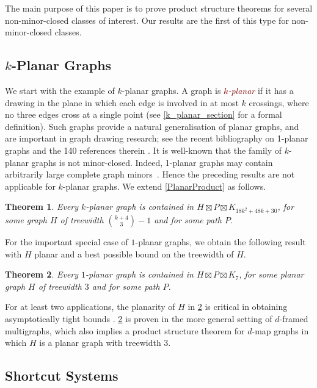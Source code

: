 \documentclass{patmorin}
\theoremstyle{plain}
\newtheorem{thm}{Theorem}
\theoremstyle{definition}
\newcommand{\defin}[1]{\textcolor{Maroon}{\emph{#1}}}
\begin{document}
The main purpose of this paper is to prove product structure theorems for several non-minor-closed classes of interest. Our results are the first of this type for non-minor-closed classes.

\subsection{$k$-Planar Graphs}

We start with the example of $k$-planar graphs. A graph is \defin{$k$-planar} if it has a drawing in the plane in which each edge is involved in at most $k$ crossings, where no three edges cross at a single point (see \cref{k_planar_section} for a formal definition). Such graphs provide a natural generalisation of planar graphs, and are important in graph drawing research; see the recent bibliography on 1-planar graphs and the 140 references therein \citep{kobourov.liotta.ea:annotated}. It is well-known that the family of $k$-planar graphs is not minor-closed.  Indeed, 1-planar graphs may contain arbitrarily large complete graph minors~\citep{dujmovic.eppstein.ea:structure}. Hence the preceding results are not applicable for  $k$-planar graphs. We extend \cref{PlanarProduct} as follows.

\begin{thm}
\label{kPlanarProduct}
Every $k$-planar graph is contained in $H\boxtimes P\boxtimes K_{18k^2+48k+30}$, for some graph $H$ of treewidth $\binom{k+4}{3}-1$ and for some path $P$.
\end{thm}

For the important special case of $1$-planar graphs, we obtain the following result with $H$ planar and a best possible bound on the treewidth of $H$.

\begin{thm}\label{1_planar_product}
Every $1$-planar graph is contained in $H\boxtimes P\boxtimes K_{7}$, for some planar graph $H$ of treewidth $3$ and for some path $P$.
\end{thm}

For at least two applications, the planarity of $H$ in \cref{1_planar_product} is critical in obtaining asymptotically tight bounds \cite{BDJM,DFMS21}. \cref{1_planar_product} is proven in the more general setting of $d$-framed multigraphs, which also implies a product structure theorem for $d$-map graphs in which $H$ is a planar graph with treewidth 3.


\subsection{Shortcut Systems}
\end{document}
